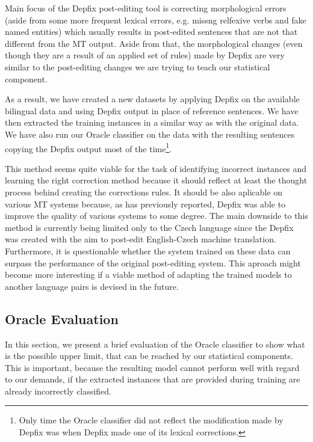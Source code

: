 Main focus of the Depfix post-editing tool is correcting morphological errors (aside from some more
frequent lexical errors, e.g. missng relfexive verbs and fake named entities) which usually 
results in post-edited sentences that are not that different from the MT output. Aside from that,
the morphological changes (even though they are a result of an applied set of rules) made
by Depfix are very similar to the post-editing changes we are trying to teach our statistical component.

As a result, we have created a new datasets by applying Depfix on the available bilingual data and
using Depfix output in place of reference sentences. We have then extracted the training instances in a
similar way as with the original data. We have also run our Oracle classifier on the data with
the resulting sentences copying the Depfix output most of the time\footnote{Only time the Oracle classifier
did not reflect the modification made by Depfix was when Depfix made one of its lexical corrections.}.

This method seems quite viable for the task of identifying incorrect instances and learning the
right correction method because it should reflect at least the thought process behind creating the corrections rules.
It should be also aplicable on various MT systems because, as \citet{depfix:2014} has
previously reported, Depfix was able to improve the quality of various systems to some degree.
The main downside to this method is currently being
limited only to the Czech language since the Depfix was
created with the aim to post-edit English-Czech machine translation.
Furthermore, it is questionable whether the system trained on these data can surpass the performance
of the original post-editing system. 
This aproach might become more interesting if a viable method of adapting the trained models
to another language pairs is devised in the future.

\subsection{Oracle Evaluation}

In this section, we present a brief evaluation of the Oracle classifier to show
what is the possible upper limit, that can be reached by our statistical components. This is
important, because the resulting model cannot perform well with regard to our demands, if the extracted
instances that are provided during training are already incorrectly classified.

